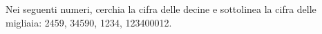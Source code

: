 \item Nei seguenti numeri, cerchia la cifra delle decine e sottolinea la cifra delle migliaia: 2459, 34590, 1234, 123400012.